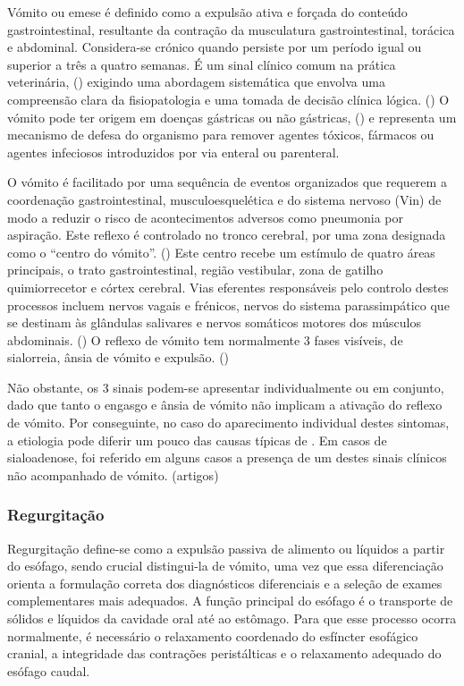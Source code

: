 Vómito ou emese é definido como a expulsão ativa e forçada do conteúdo gastrointestinal, resultante da contração da musculatura gastrointestinal, torácica e abdominal. \cite{Das_Textbook}Considera-se crónico quando persiste por um período igual ou superior a três a quatro semanas. \cite{bsava_2020_gastro} É um sinal clínico comum na prática veterinária, (\cite{Dixit2022}) exigindo uma abordagem sistemática que envolva uma compreensão clara da fisiopatologia e uma tomada de decisão clínica lógica. (\cite{Elwood2010}) O vómito pode ter origem em doenças gástricas ou não gástricas, (\cite{McGrotty2010}) e representa um mecanismo de defesa do organismo para remover agentes tóxicos, fármacos ou agentes infeciosos introduzidos por via enteral ou parenteral. \cite{Das_Textbook}


O vómito é facilitado por uma sequência de eventos organizados que requerem a coordenação gastrointestinal, musculoesquelética e do sistema nervoso (Vin) de modo a reduzir o risco de acontecimentos adversos como pneumonia por aspiração. Este reflexo é controlado no tronco cerebral, por uma zona designada como o “centro do vómito”. (\cite{Elwood2010}) Este centro recebe um estímulo de quatro áreas principais, o trato gastrointestinal, região vestibular, zona de gatilho quimiorrecetor  e córtex cerebral. \cite{Das_Textbook} Vias eferentes responsáveis pelo controlo destes processos incluem nervos vagais e frénicos, nervos do sistema parassimpático que se destinam às glândulas salivares e nervos somáticos motores dos músculos abdominais. (\cite{Elwood2010}) O reflexo de vómito tem normalmente 3 fases visíveis, de sialorreia, ânsia de vómito e expulsão. (\cite{Elwood2010}) 


Não obstante, os 3 sinais podem-se apresentar individualmente ou em conjunto, dado que tanto o engasgo e ânsia de vómito não implicam a ativação do reflexo de vómito. Por conseguinte, no caso do aparecimento individual destes sintomas, a etiologia pode diferir um pouco das causas típicas de \cite{Elwood2010,Das_Textbook}.  Em casos de sialoadenose, foi referido em alguns casos a presença de um destes sinais clínicos não acompanhado de vómito. (artigos)


\subsubsection{Regurgitação}

Regurgitação define-se como a expulsão passiva de alimento ou líquidos a partir do esófago, \cite{bsava_2020_gastro,canine_gastro_2013} sendo crucial distingui-la de vómito, \cite{_canine_gastro_2013} uma vez que essa diferenciação orienta a formulação correta dos diagnósticos diferenciais e a seleção de exames complementares mais adequados. \cite{bsava_2020_gastro}
A função principal do esófago é o transporte de sólidos e líquidos da cavidade oral até ao estômago. \cite{canine_gastro_2013} Para que esse processo ocorra normalmente, é necessário o relaxamento coordenado do esfíncter esofágico cranial, a integridade das contrações peristálticas e o relaxamento adequado do esófago caudal. \cite{_canine_gastro_2013}


